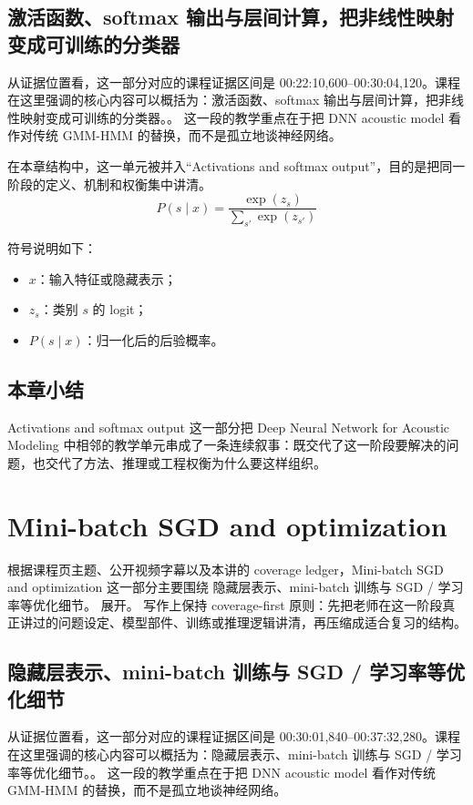 \documentclass[a4paper]{article}
\begin{document}
\subsection{激活函数、softmax 输出与层间计算，把非线性映射变成可训练的分类器}
从证据位置看，这一部分对应的课程证据区间是 00:22:10,600--00:30:04,120。课程在这里强调的核心内容可以概括为：激活函数、softmax 输出与层间计算，把非线性映射变成可训练的分类器。。
这一段的教学重点在于把 DNN acoustic model 看作对传统 GMM-HMM 的替换，而不是孤立地谈神经网络。

在本章结构中，这一单元被并入“Activations and softmax output”，目的是把同一阶段的定义、机制和权衡集中讲清。
\[
P(s \mid x) = \frac{\exp(z_s)}{\sum_{s'} \exp(z_{s'})}
\]

符号说明如下：
\begin{itemize}
\item $x$：输入特征或隐藏表示；
\item $z_s$：类别 $s$ 的 logit；
\item $P(s \mid x)$：归一化后的后验概率。
\end{itemize}

\subsection{本章小结}
Activations and softmax output 这一部分把 Deep Neural Network for Acoustic Modeling 中相邻的教学单元串成了一条连续叙事：既交代了这一阶段要解决的问题，也交代了方法、推理或工程权衡为什么要这样组织。

\section{Mini-batch SGD and optimization}
根据课程页主题、公开视频字幕以及本讲的 coverage ledger，Mini-batch SGD and optimization 这一部分主要围绕 隐藏层表示、mini-batch 训练与 SGD / 学习率等优化细节。 展开。
写作上保持 coverage-first 原则：先把老师在这一阶段真正讲过的问题设定、模型部件、训练或推理逻辑讲清，再压缩成适合复习的结构。

\subsection{隐藏层表示、mini-batch 训练与 SGD / 学习率等优化细节}
从证据位置看，这一部分对应的课程证据区间是 00:30:01,840--00:37:32,280。课程在这里强调的核心内容可以概括为：隐藏层表示、mini-batch 训练与 SGD / 学习率等优化细节。。
这一段的教学重点在于把 DNN acoustic model 看作对传统 GMM-HMM 的替换，而不是孤立地谈神经网络。
\end{document}
